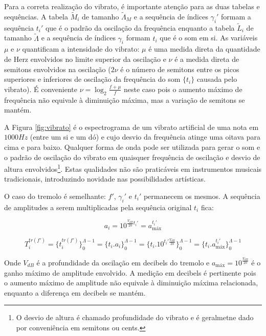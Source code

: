 Para a correta realização do vibrato, é importante atenção para as duas tabelas e sequências.
A tabela $\widetilde{M}_i$ de tamanho $\widetilde{\Lambda}_M$ e a sequência de índices $\gamma_i'$ formam a sequência $t_i'$
 que é o padrão da oscilação da frequência enquanto
a tabela $\widetilde{L}_i$ de tamanho $\widetilde{\Lambda}$ e a sequência de índices $\gamma_i$ formam $t_i$ que é o som em si.
As variáveis $\mu$ e $\nu$ quantificam a intensidade do vibrato: $\mu$ é uma medida direta da quantidade
de Herz envolvidos no limite superior da oscilação e $\nu$ é a medida direta de semitons envolvidos na oscilação ($2\nu$ é o número de semitons entre os picos superiores e inferiores de oscilação da frequência do som $\{t_i\}$ causada pelo vibrato).
É conveniente $\nu=\log_{2}\frac{f+\mu}{f} $ neste caso pois o aumento máximo de frequência
não equivale à diminuição máxima, mas a variação de semitons se mantém.

A Figura \ref{fig:vibrato} é o espectrograma de um vibrato artificial de uma nota em
$1000Hz$ (entre um si e um dó) e cujo desvio da frequência atinge uma oitava
para cima e para baixo. Qualquer forma de onda pode
ser utilizada para gerar o som e o padrão de oscilação do vibrato
em quaisquer frequência de oscilação e desvio de altura envolvidos\footnote{O desvio de altura
é chamado profundidade do vibrato e é geralmetne dado por conveniência em semitons ou cents.}. Estas qualidades não são praticáveis em instrumentos musicais tradicionais, introduzindo novidade nas possibilidades artísticas.

O caso do tremolo é semelhante: $f'$, $\gamma_i'$ e $t_i'$ permanecem os mesmos.
A sequência de amplitudes a serem multiplicadas pela sequência original $t_i$ fica:

\begin{equation}\label{trA}
a_i=10^{\frac{V_{dB}}{20}t_i' } = a_{\text{máx}}^{t_i'}
\end{equation}

\begin{equation}\label{trT}
T_i^{tr(f')}=\{ t_i^{tr(f')} \}_0^{\Lambda-1}=\{ t_i . a_i \}_0^{\Lambda-1}=\{t_i .10^{t_i' \frac{V_{dB}}{20}}    \}_0^{\Lambda-1}=\{t_i . a_{\text{máx}}^{t_i'}\}_0^{\Lambda-1}
\end{equation}

Onde $V_{dB}$ é a profundidade da oscilação em decibels do tremolo e $a_{\text{máx}}=10^{\frac{V_{dB}}{20}}$
 é o ganho máximo de amplitude envolvido.
A medição em decibels é pertinente pois o aumento máximo de amplitude
não equivale à diminuição máxima relacionada, enquanto a diferença em decibels se mantém.


